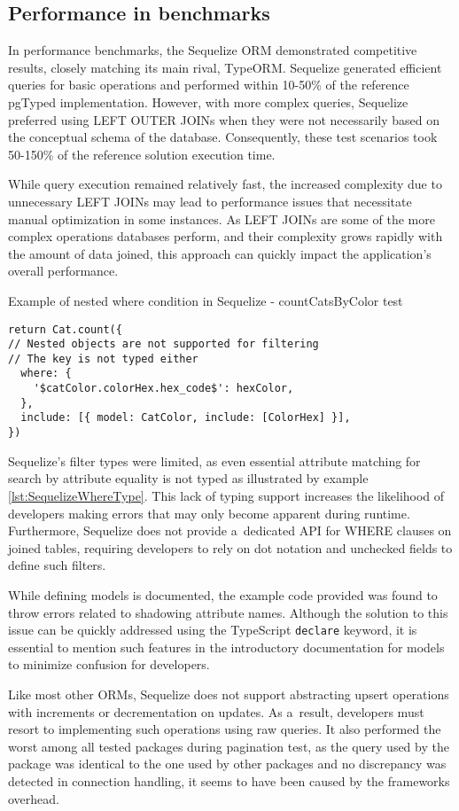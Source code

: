 \subsection*{Performance in benchmarks}

In performance benchmarks, the Sequelize ORM demonstrated competitive results,
closely matching its main rival, TypeORM. Sequelize generated efficient queries
for basic operations and performed within 10-50\% of the reference pgTyped
implementation. However, with more complex queries, Sequelize preferred using
LEFT OUTER JOINs when they were not necessarily based on the conceptual schema
of the database. Consequently, these test scenarios took 50-150\% of the
reference solution execution time.

While query execution remained relatively fast, the increased complexity due to
unnecessary LEFT JOINs may lead to performance issues that necessitate manual
optimization in some instances. As LEFT JOINs are some of the more complex
operations databases perform, and their complexity grows rapidly with the amount
of data joined, this approach can quickly impact the application's overall
performance.

\begin{listing}
    \caption{Example of nested where condition in Sequelize - countCatsByColor test}
    \label{lst:SequelizeWhereType}
\begin{verbatim}
return Cat.count({
// Nested objects are not supported for filtering
// The key is not typed either
  where: {
    '$catColor.colorHex.hex_code$': hexColor,
  },
  include: [{ model: CatColor, include: [ColorHex] }],
})
    \end{verbatim}
\end{listing}

Sequelize's filter types were limited, as even essential attribute matching for
search by attribute equality is not typed as illustrated by example
\autoref{lst:SequelizeWhereType}. This lack of typing support increases the
likelihood of developers making errors that may only become apparent during
runtime. Furthermore, Sequelize does not provide a~dedicated API for WHERE
clauses on joined tables, requiring developers to rely on dot notation and
unchecked fields to define such filters.

While defining models is documented, the example code provided was found to
throw errors related to shadowing attribute names. Although the solution to this
issue can be quickly addressed using the TypeScript \texttt{declare} keyword, it is
essential to mention such features in the introductory documentation for models
to minimize confusion for developers.

Like most other ORMs, Sequelize does not support abstracting upsert operations
with increments or decrementation on updates. As a~result, developers must
resort to implementing such operations using raw queries. It also performed the
worst among all tested packages during pagination test, as the query used by the
package was identical to the one used by other packages and no discrepancy was
detected in connection handling, it seems to have been caused by the frameworks
overhead.
